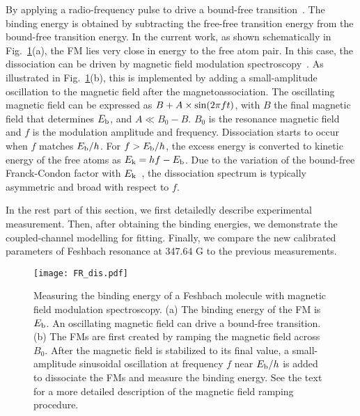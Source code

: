 By applying a radio-frequency pulse to drive a bound-free transition~\cite{Bartenstein2005,Zurn2013,Chapurin2019}. The binding energy is obtained by subtracting the free-free transition energy from the bound-free transition energy. In the current work, as shown schematically in Fig.~\ref{FR_dis}(a), the FM lies very close in energy to the free atom pair. In this case, the dissociation can be driven by magnetic field modulation spectroscopy~\cite{Claussen2003,Thompson2005}. As illustrated in Fig.~\ref{FR_dis}(b), this is implemented by adding a small-amplitude oscillation to the magnetic field after the magnetoassociation. The oscillating magnetic field can be expressed as $B+A\times{\rm sin}(2\pi f t)$, with $B$ the final magnetic field that determines $E_{\rm b}$, and $A\ll B_0-B $. $B_0$ is the resonance magnetic field and $f$ is the modulation amplitude and frequency. Dissociation starts to occur when $f$ matches $E_{\rm b}/h$. For $f > E_{\rm b}/h$, the excess energy is converted to kinetic energy of the free atoms as $E_{\rm k} = hf - E_{\rm b}$. Due to the variation of the bound-free Franck-Condon factor with $E_{\rm k}$~\cite{Chin2005radio}, the dissociation spectrum is typically asymmetric and broad with respect to $f$.

In the rest part of this section, we first detailedly describe experimental measurement. Then, after obtaining the binding energies, we demonstrate the coupled-channel modelling for fitting. Finally, we compare the new calibrated parameters of Feshbach resonance at 347.64 G to the previous measurements.

\begin{figure}[htb]
\begin{center}
\texttt{[image: FR\_dis.pdf]}
\end{center}
\caption[Time sequence for measuring binding energy of Feshbach molecules]{Measuring the binding energy of a Feshbach molecule with magnetic field modulation spectroscopy. (a) The binding energy of the FM is $E_{\rm b}$. An oscillating magnetic field can drive a bound-free transition. (b) The FMs are first created by ramping the magnetic field across $B_0$. After the magnetic field is stabilized to its final value, a small-amplitude sinusoidal oscillation at frequency $f$ near $E_{\rm b}/h$ is added to dissociate the FMs and measure the binding energy. See the text for a more detailed description of the magnetic field ramping procedure.}
\label{FR_dis}
\end{figure}

